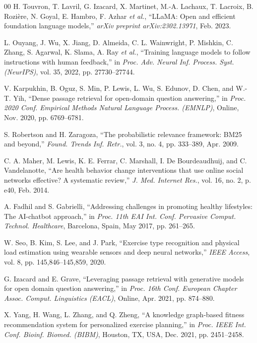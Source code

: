 \documentclass[conference]{IEEEtran}
\begin{document}
\begin{thebibliography}{00}
H. Touvron, T. Lavril, G. Izacard, X. Martinet, M.-A. Lachaux, T. Lacroix, B. Rozi\`{e}re, N. Goyal, E. Hambro, F. Azhar \textit{et al.}, ``LLaMA: Open and efficient foundation language models,'' \textit{arXiv preprint arXiv:2302.13971}, Feb. 2023.

L. Ouyang, J. Wu, X. Jiang, D. Almeida, C. L. Wainwright, P. Mishkin, C. Zhang, S. Agarwal, K. Slama, A. Ray \textit{et al.}, ``Training language models to follow instructions with human feedback,'' in \textit{Proc. Adv. Neural Inf. Process. Syst. (NeurIPS)}, vol. 35, 2022, pp. 27730--27744.

V. Karpukhin, B. Oguz, S. Min, P. Lewis, L. Wu, S. Edunov, D. Chen, and W.-T. Yih, ``Dense passage retrieval for open-domain question answering,'' in \textit{Proc. 2020 Conf. Empirical Methods Natural Language Process. (EMNLP)}, Online, Nov. 2020, pp. 6769--6781.

S. Robertson and H. Zaragoza, ``The probabilistic relevance framework: BM25 and beyond,'' \textit{Found. Trends Inf. Retr.}, vol. 3, no. 4, pp. 333--389, Apr. 2009.

C. A. Maher, M. Lewis, K. E. Ferrar, C. Marshall, I. De Bourdeaudhuij, and C. Vandelanotte, ``Are health behavior change interventions that use online social networks effective? A systematic review,'' \textit{J. Med. Internet Res.}, vol. 16, no. 2, p. e40, Feb. 2014.

A. Fadhil and S. Gabrielli, ``Addressing challenges in promoting healthy lifestyles: The AI-chatbot approach,'' in \textit{Proc. 11th EAI Int. Conf. Pervasive Comput. Technol. Healthcare}, Barcelona, Spain, May 2017, pp. 261--265.

W. Seo, B. Kim, S. Lee, and J. Park, ``Exercise type recognition and physical load estimation using wearable sensors and deep neural networks,'' \textit{IEEE Access}, vol. 8, pp. 145,846--145,859, 2020.

G. Izacard and E. Grave, ``Leveraging passage retrieval with generative models for open domain question answering,'' in \textit{Proc. 16th Conf. European Chapter Assoc. Comput. Linguistics (EACL)}, Online, Apr. 2021, pp. 874--880.

X. Yang, H. Wang, L. Zhang, and Q. Zheng, ``A knowledge graph-based fitness recommendation system for personalized exercise planning,'' in \textit{Proc. IEEE Int. Conf. Bioinf. Biomed. (BIBM)}, Houston, TX, USA, Dec. 2021, pp. 2451--2458.


\end{thebibliography}
\end{document}
